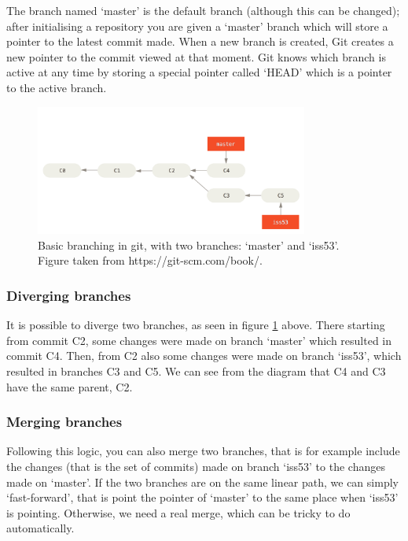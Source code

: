 \documentclass[12pt,twoside,notitlepage]{report}
\begin{document}
The branch named `master' is the default branch (although this can be changed); after initialising a repository you are given a `master' branch which will store a pointer to the latest commit made. When a new branch is created, Git creates a new pointer to the commit viewed at that moment. Git knows which branch is active at any time by storing a special pointer called `HEAD' which is a pointer to the active branch.
\begin{figure}[ht!]
\includegraphics[width=0.8\textwidth]{basic-branching_git.png}
\centering

\captionsetup{width=0.8\textwidth}
\caption[Basic branching in Git]{Basic branching in git, with two branches: `master' and `iss53'. Figure taken from https://git-scm.com/book/.}
\label{basic-branching_git}
\end{figure}

\subsubsection*{Diverging branches}
It is possible to diverge two branches, as seen in figure \ref{basic-branching_git} above. There starting from commit C2, some changes were made on branch `master' which resulted in commit C4. Then, from C2 also some changes were made on branch `iss53', which resulted in branches C3 and C5. We can see from the diagram that C4 and C3 have the same parent, C2.

\subsubsection*{Merging branches}
Following this logic, you can also merge two branches, that is for example include the changes (that is the set of commits) made on branch `iss53' to the changes made on `master'. If the two branches are on the same linear path, we can simply `fast-forward', that is point the pointer of `master' to the same place when `iss53' is pointing. Otherwise, we need a real merge, which can be tricky to do automatically.
\end{document}
